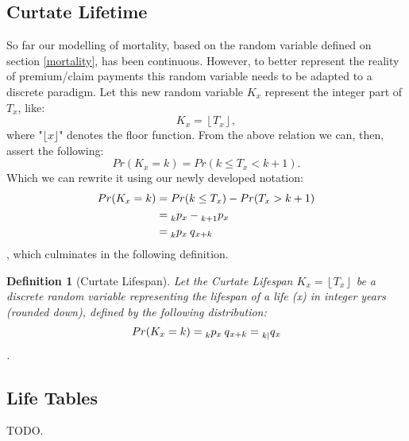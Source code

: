 \documentclass[a4paper]{report}
\newtheorem{definition}{Definition}
\newcommand{\q}[2]{\prescript{}{#1}{q}_{#2}}
\newcommand{\p}[2]{\prescript{}{#1}{p}_{#2}}
\begin{document}
   \subsection{Curtate Lifetime}
  
   So far our modelling of mortality, based on the random 
   variable defined on section \ref{mortality}, 
   has been continuous. 
   However, to better represent the reality of premium/claim 
    payments this random variable needs to be adapted to 
   a discrete paradigm.
   Let this new random variable $K_x$ represent the integer 
   part of $T_x$, like:
    \[
   K_x = \left\lfloor T_x \right\rfloor,
   \]
   where "$\lfloor x \rfloor$" denotes the floor function.
   From the above relation we can, then, assert the 
   following:
   \begin{equation}
     Pr(K_x = k) = Pr(k \le T_x < k+1).
   \end{equation}
   Which we can rewrite it using our newly developed 
   notation: 
   \begin{align*}
     Pr(K_x=k) &= Pr(k \le T_x) - Pr(T_x > k+1) \\
               &= \p{k}{x} - \p{k+1}{x} \\
               &= \p{k}{x}\q{}{x+k}
   \end{align*}
    , which culminates in the following definition.

    \begin{definition}[Curtate Lifespan]
      Let the Curtate Lifespan
      $K_x = \left\lfloor T_x \right\rfloor$  be a discrete 
      random variable representing the lifespan of a life
      (x) in integer years (rounded down), 
      defined by the following distribution: 
      \begin{equation}
	Pr(K_x = k) = \p{k}{x}\q{}{x+k} = \q{k \mid}{x}
      \end{equation}.
    \end{definition}

   \subsection{Life Tables}
   
   TODO.
\end{document}

